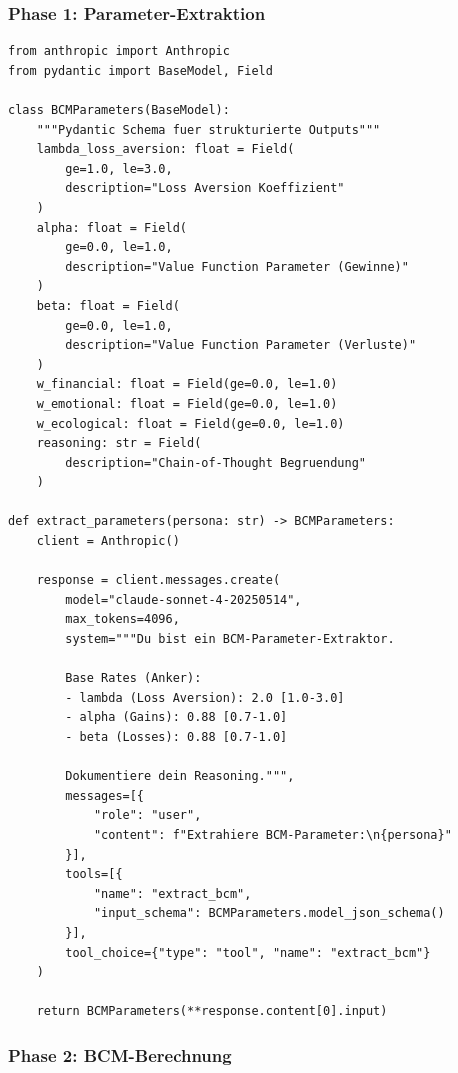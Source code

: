 \documentclass[12pt,a4paper]{article}
\begin{document}
\subsubsection{Phase 1: Parameter-Extraktion}

\begin{lstlisting}[caption={Phase 1: LLM-basierte Parameter-Extraktion}]
from anthropic import Anthropic
from pydantic import BaseModel, Field

class BCMParameters(BaseModel):
    """Pydantic Schema fuer strukturierte Outputs"""
    lambda_loss_aversion: float = Field(
        ge=1.0, le=3.0,
        description="Loss Aversion Koeffizient"
    )
    alpha: float = Field(
        ge=0.0, le=1.0,
        description="Value Function Parameter (Gewinne)"
    )
    beta: float = Field(
        ge=0.0, le=1.0,
        description="Value Function Parameter (Verluste)"
    )
    w_financial: float = Field(ge=0.0, le=1.0)
    w_emotional: float = Field(ge=0.0, le=1.0)
    w_ecological: float = Field(ge=0.0, le=1.0)
    reasoning: str = Field(
        description="Chain-of-Thought Begruendung"
    )

def extract_parameters(persona: str) -> BCMParameters:
    client = Anthropic()

    response = client.messages.create(
        model="claude-sonnet-4-20250514",
        max_tokens=4096,
        system="""Du bist ein BCM-Parameter-Extraktor.

        Base Rates (Anker):
        - lambda (Loss Aversion): 2.0 [1.0-3.0]
        - alpha (Gains): 0.88 [0.7-1.0]
        - beta (Losses): 0.88 [0.7-1.0]

        Dokumentiere dein Reasoning.""",
        messages=[{
            "role": "user",
            "content": f"Extrahiere BCM-Parameter:\n{persona}"
        }],
        tools=[{
            "name": "extract_bcm",
            "input_schema": BCMParameters.model_json_schema()
        }],
        tool_choice={"type": "tool", "name": "extract_bcm"}
    )

    return BCMParameters(**response.content[0].input)
\end{lstlisting}

\subsubsection{Phase 2: BCM-Berechnung}
\end{document}
